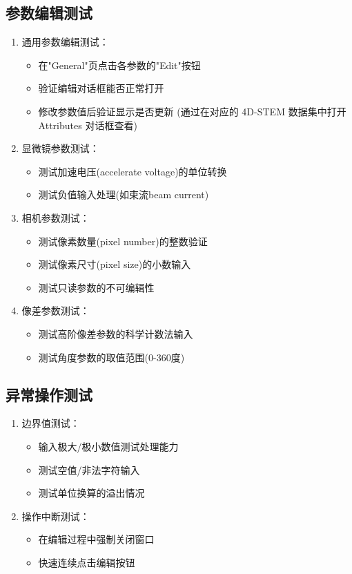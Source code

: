 \documentclass[a4paper,12pt]{report}	%
\begin{document}
\subsection{参数编辑测试}
\begin{enumerate}
    \item 通用参数编辑测试：
    \begin{itemize}
        \item 在"General"页点击各参数的"Edit"按钮
        \item 验证编辑对话框能否正常打开
        \item 修改参数值后验证显示是否更新 (通过在对应的 4D-STEM 数据集中打开 Attributes 对话框查看)
    \end{itemize}
    
    \item 显微镜参数测试：
    \begin{itemize}
        \item 测试加速电压(accelerate voltage)的单位转换
        \item 测试负值输入处理(如束流beam current)
    \end{itemize}
    
    \item 相机参数测试：
    \begin{itemize}
        \item 测试像素数量(pixel number)的整数验证
        \item 测试像素尺寸(pixel size)的小数输入
        \item 测试只读参数的不可编辑性
    \end{itemize}
    
    \item 像差参数测试：
    \begin{itemize}
        \item 测试高阶像差参数的科学计数法输入
        \item 测试角度参数的取值范围(0-360度)
    \end{itemize}
\end{enumerate}

\subsection{异常操作测试}
\begin{enumerate}
    \item 边界值测试：
    \begin{itemize}
        \item 输入极大/极小数值测试处理能力
        \item 测试空值/非法字符输入
        \item 测试单位换算的溢出情况
    \end{itemize}
    
    \item 操作中断测试：
    \begin{itemize}
        \item 在编辑过程中强制关闭窗口
        \item 快速连续点击编辑按钮
    \end{itemize}
\end{enumerate}
\end{document}
